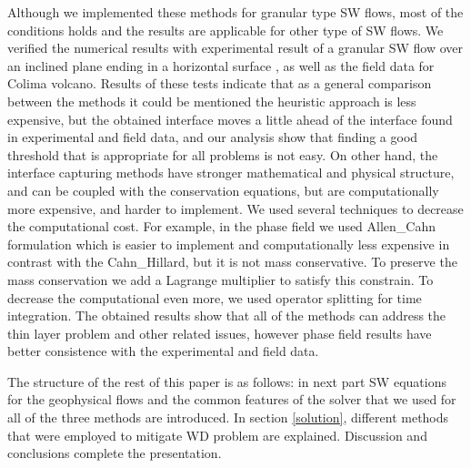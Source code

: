 \documentclass[letterpaper,10pt]{article}
\begin{document}
  Although we implemented these methods for granular type SW flows, most of the conditions holds and the results are applicable for other type of SW flows.  We verified the numerical results with experimental result of a granular SW flow over an inclined plane ending in a horizontal surface , as well as the field data for Colima volcano.
Results of  these tests  indicate that
as a general comparison between the methods it could be mentioned the heuristic approach is less expensive, but the obtained interface moves a little ahead of the interface found in experimental and field data, and our analysis show that finding a good threshold that is appropriate for all problems is not easy. 
On other hand, the interface capturing methods have stronger mathematical and physical structure, and can be coupled with the conservation equations, but are computationally more expensive, and harder to implement. We used several techniques to decrease the computational cost. For example, in the phase field we used Allen\_Cahn formulation which is easier to implement and computationally less expensive in contrast with the Cahn\_Hillard, but it is not mass conservative. To preserve the mass conservation we add a Lagrange multiplier to satisfy this constrain. To decrease the computational even more, we used operator splitting for time integration. The obtained results show that all of the methods can address the thin layer problem and other related issues, however phase field results have better consistence with the experimental and field data. 

The structure of the rest of this paper is as follows: in next part SW equations for the geophysical flows and the common features of the solver that we used for all of the three methods are introduced. In section \ref{solution}, 
different methods that were employed to mitigate WD problem are explained. %
Discussion and conclusions complete the presentation.
\end{document}
